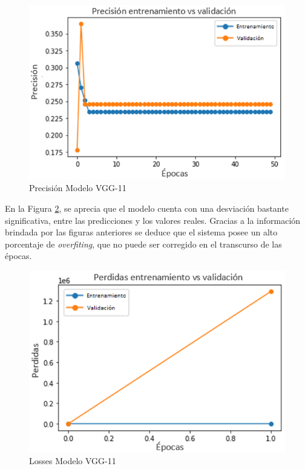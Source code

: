 \begin{figure}[ht]
	\centering
	\includegraphics[scale=0.5]{Figs/105.png}
	\caption{Precisión Modelo VGG-11}
	\label{fig:precision_VGG11}
\end{figure}

En la Figura \ref{fig:loses_VGG11}, se aprecia que el modelo cuenta con una desviación bastante significativa, entre las predicciones y los valores reales. Gracias a la información brindada por las figuras anteriores se deduce que el sistema posee un alto porcentaje de \textit{overfiting}, que no puede ser corregido en el transcurso de las épocas.

\begin{figure}[ht]
	\centering
	\includegraphics[scale=0.5]{Figs/106.png}
	\caption{Losses Modelo VGG-11}
	\label{fig:loses_VGG11}
\end{figure}

